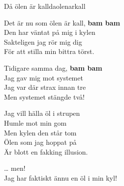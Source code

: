 \begin{song}{Då ölen är kall}{daolenarkall}
    \begin{vers}
        Det är nu som ölen är kall, \textbf{bam bam}\\
        Den har väntat på mig i kylen\\
        Sakteligen jag rör mig dig\\
        För att stilla min bittra törst.\\
    \end{vers}
    \newp
    \begin{vers}
        Tidigare samma dag, \textbf{bam bam}\\
        Jag gav mig mot systemet\\
        Jag var där strax innan tre\\
        Men systemet stängde två!\\
    \end{vers}
    \newp
    \begin{vers}
        Jag vill hälla öl i strupen\\
        Humle mot min gom\\
        Men kylen den står tom\\
        Ölen som jag hoppat på\\
        Är blott en fakking illusion.\\
    \end{vers}
    \newp
    \begin{vers}
        … men!\\
        Jag har faktiskt ännu en öl i min kyl!\\
    \end{vers}
    \end{song}
    
